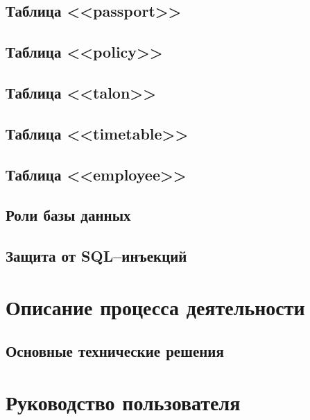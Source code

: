 \subsection{Таблица <<passport>>}

\subsection{Таблица <<policy>>}

\subsection{Таблица <<talon>>}

\subsection{Таблица <<timetable>>}

\subsection{Таблица <<employee>>}

\subsection{Роли базы данных}

\subsection{Защита от SQL–инъекций}


\clearpage
\section{Описание процесса деятельности} 
\setcounter{figure}{0}


\clearpage
\subsection{Основные технические решения}


\clearpage
\section{Руководство пользователя} 
\setcounter{figure}{0}


% 
% 


